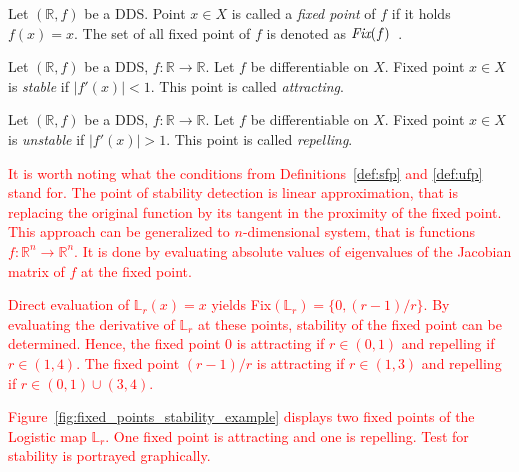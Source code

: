 \label{def:fixed point}
\begin{definition}
    Let $\left( \mathbb{R}, f \right)$ be a DDS. Point $x \in X$ is called a \emph{fixed point} of $f$ if it holds $f(x) = x$.
    The set of all fixed point of $f$ is denoted as $\emph{Fix}(f)$~\cite{Devaney20211026}.
\end{definition}

\label{def:sfp}
\begin{definition}
    Let $\left(\mathbb{R}, f\right)$ be a DDS, $f:\mathbb{R} \rightarrow \mathbb{R}$. Let $f$ be differentiable on $X$. Fixed point $x \in X$ is \emph{stable} if $|f'(x)| < 1$.
    This point is called \emph{attracting}.
\end{definition}

\label{def:ufp}
\begin{definition}
    Let $\left(\mathbb{R}, f\right)$ be a DDS, $f:\mathbb{R} \rightarrow \mathbb{R}$. Let $f$ be differentiable on $X$. Fixed point $x \in X$ is \emph{unstable} if $|f'(x)| > 1$.
    This point is called \emph{repelling}.
\end{definition}

\begin{remark}
    \textcolor{red}{
        It is worth noting what the conditions from Definitions~\ref{def:sfp} and \ref{def:ufp} stand for.
        The point of stability detection is linear approximation, that is replacing the original function by its tangent in the proximity of the fixed point.
        This approach can be generalized to $n$-dimensional system, that is functions $f: \mathbb{R}^{n} \rightarrow \mathbb{R}^{n}$.
        It is done by evaluating absolute values of eigenvalues of the Jacobian matrix of $f$ at the fixed point.
    }
    \par
    \textcolor{red}{
    Direct evaluation of $\mathbb{L}_{r}(x)=x$ yields Fix$(\mathbb{L}_{r}) = \{ 0, (r-1)/r \}$.
    By evaluating the derivative of $\mathbb{L}_{r}$ at these points, stability of the fixed point can be determined.
    Hence, the fixed point $0$ is attracting if $r \in (0, 1)$ and repelling if $r \in (1, 4)$.
    The fixed point $(r-1)/r$ is attracting if $r \in (1, 3)$ and repelling if $r \in (0, 1) \cup (3, 4) $.
    }
    \par
    \textcolor{red}{
    Figure~\ref{fig:fixed_points_stability_example} displays two fixed points of the Logistic map $\mathbb{L}_{r}$.
    One fixed point is attracting and one is repelling. Test for stability is portrayed graphically.
    }
\end{remark}

